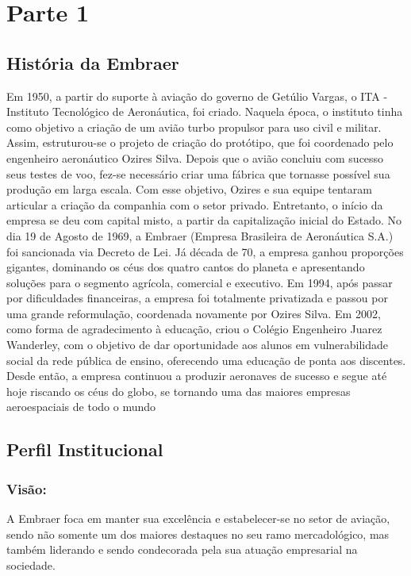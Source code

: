 
\chapter{Parte 1}

\section{História da Embraer}
Em 1950, a partir do suporte à aviação do governo de Getúlio Vargas, o ITA - Instituto Tecnológico de Aeronáutica, foi criado. Naquela época, o instituto tinha como objetivo a criação de um avião turbo propulsor para uso civil e militar. Assim, estruturou-se o projeto de criação do protótipo, que foi coordenado pelo engenheiro aeronáutico Ozires Silva. Depois que o avião concluiu com sucesso seus testes de voo, fez-se necessário criar uma fábrica que tornasse possível sua produção em larga escala. 
	Com esse objetivo, Ozires e sua equipe tentaram articular a criação da companhia com o  setor privado. Entretanto, o início da empresa se deu com capital misto, a partir da capitalização inicial do Estado. No dia 19 de Agosto de 1969, a Embraer (Empresa Brasileira de Aeronáutica S.A.) foi sancionada via Decreto de Lei. Já década de 70, a empresa ganhou proporções gigantes, dominando os céus dos quatro cantos do planeta e apresentando soluções para o segmento agrícola, comercial e executivo.
	Em 1994, após passar por dificuldades financeiras, a empresa foi totalmente privatizada e passou por uma grande reformulação, coordenada novamente por Ozires Silva. Em 2002, como forma de agradecimento à educação, criou o Colégio Engenheiro Juarez Wanderley, com o objetivo de dar oportunidade aos alunos em vulnerabilidade social da rede pública de ensino, oferecendo uma educação de ponta aos discentes. Desde então, a empresa continuou a produzir aeronaves de sucesso e segue até hoje riscando os céus do globo, se tornando uma das maiores empresas aeroespaciais de todo o mundo



\section{Perfil Institucional}

\subsection{Visão:}
	A Embraer foca em manter sua excelência e estabelecer-se no setor de aviação, sendo não somente um dos maiores destaques no seu ramo mercadológico, mas também liderando e sendo condecorada pela sua atuação empresarial na sociedade.

